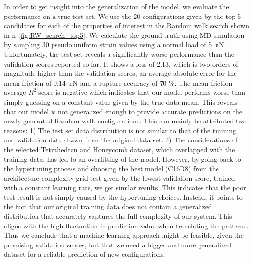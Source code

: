 In order to get insight into the generalization of the model, we
evaluate the performance on a true test set. We use the 20 configurations given by the top 5 candidates for each of the properties of interest in the Random walk search shown in n~\cref{fig:RW_search_top5}. We calculate the ground truth using \acrshort{MD} simulation by sampling 30 pseudo uniform strain values using a normal load of \SI{5}{nN}. Unfortunately, the test set reveals a significantly worse performance than the validation scores reported so far. It shows a loss
of 2.13, which is two orders of magnitude higher than the validation scores, an
average absolute error for the mean friction of \SI{0.14}{nN} and a rupture
accuracy of 70 \%. The mean friction average $R^2$ score is negative which indicates that our model performs worse than simply guessing on a constant
value given by the true data mean. This reveals that our model is not
generalized enough to provide accurate predictions on the newly generated Random
walk configurations. This can mainly be attributed two reasons: 1) The test set data distribution is not similar to that of the training and validation data drawn from the original data set. 2) The considerations of the selected Tetrahedron and Honeycomb dataset, which overlapped with the training data, has led to an overfitting of the model. However, by going back to the hypertuning process and choosing the best model (C16D8) from the architecture complexity grid test given by the lowest validation score, trained with a constant learning rate, we get similar
results. This indicates that the poor test result is not simply caused by the hypertuning choices. Instead, it points to the fact that our original training data does not contain a generalized distribution that accurately captures the full complexity of our system. This aligns with the high fluctuation in prediction value when translating the patterns. Thus we conclude that a machine learning approach might be feasible, given the promising validation scores, but that we need a bigger and more generalized dataset for a reliable prediction of new configurations. 






